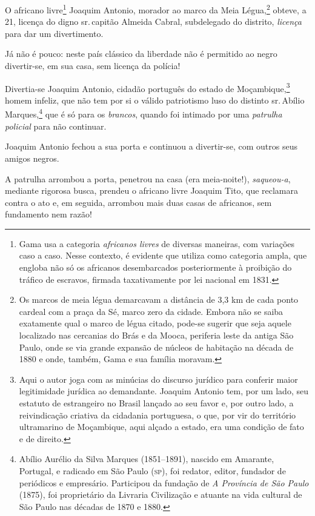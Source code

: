 O africano livre\footnote{Gama usa a categoria \emph{africanos livres}
  de diversas maneiras, com variações caso a caso. Nesse contexto, é
  evidente que utiliza como categoria ampla, que engloba não só os
  africanos desembarcados posteriormente à proibição do tráfico de
  escravos, firmada taxativamente por lei nacional em 1831.} Joaquim
Antonio, morador ao marco da Meia Légua,\footnote{Os marcos de meia
  légua demarcavam a distância de 3,3 km de cada ponto cardeal com a
  praça da Sé, marco zero da cidade. Embora não se saiba exatamente qual
  o marco de légua citado, pode-se sugerir que seja aquele localizado
  nas cercanias do Brás e da Mooca, periferia leste da antiga São Paulo,
  onde se via grande expansão de núcleos de habitação na década de 1880
  e onde, também, Gama e sua família moravam.} obteve, a 21, licença do
digno sr.\,capitão Almeida Cabral, subdelegado do distrito,
\emph{licença} para dar um divertimento.

Já não é pouco: neste país clássico da liberdade não é permitido ao
negro divertir-se, em sua casa, sem licença da polícia!

Divertia-se Joaquim Antonio, cidadão português do estado de
Moçambique,\footnote{Aqui o autor joga com as minúcias do discurso
  jurídico para conferir maior legitimidade jurídica ao demandante.
  Joaquim Antonio tem, por um lado, seu estatuto de estrangeiro no
  Brasil lançado ao seu favor e, por outro lado, a reivindicação
  criativa da cidadania portuguesa, o que, por vir do território
  ultramarino de Moçambique, aqui alçado a estado, era uma condição de
  fato e de direito.} homem infeliz, que não tem por si o válido
patriotismo luso do distinto sr.\,Abílio Marques,\footnote{Abílio
  Aurélio da Silva Marques (1851--1891), nascido em Amarante, Portugal, e
  radicado em São Paulo (\textsc{sp}), foi redator, editor, fundador de
  periódicos e empresário. Participou da fundação de \emph{A Província
  de São Paulo} (1875), foi proprietário da Livraria Civilização e
  atuante na vida cultural de São Paulo nas décadas de 1870 e 1880.}
que é só para os
\emph{brancos}, quando foi intimado por uma \emph{patrulha policial}
para não continuar.

Joaquim Antonio fechou a sua porta e continuou a divertir-se, com outros
seus amigos negros.

A patrulha arrombou a porta, penetrou na casa (era meia-noite!),
\emph{saqueou-a}, mediante rigorosa busca, prendeu o africano livre
Joaquim Tito, que reclamara contra o ato e, em seguida, arrombou mais
duas casas de africanos, sem fundamento nem razão!

